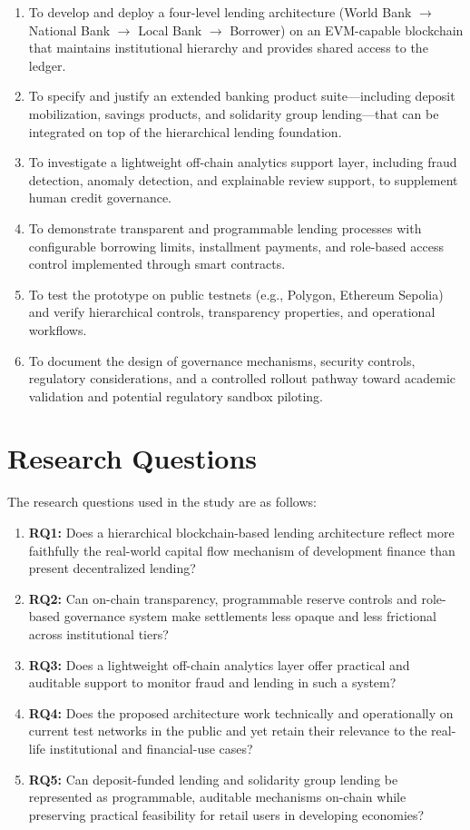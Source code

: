 \documentclass[12pt,a4paper]{report}
\begin{document}
\begin{enumerate}[noitemsep]
\item To develop and deploy a four-level lending architecture (World Bank $\to$ National Bank $\to$ Local Bank $\to$ Borrower) on an EVM-capable blockchain that maintains institutional hierarchy and provides shared access to the ledger.
\item To specify and justify an extended banking product suite---including deposit mobilization, savings products, and solidarity group lending---that can be integrated on top of the hierarchical lending foundation.
\item To investigate a lightweight off-chain analytics support layer, including fraud detection, anomaly detection, and explainable review support, to supplement human credit governance.
\item To demonstrate transparent and programmable lending processes with configurable borrowing limits, installment payments, and role-based access control implemented through smart contracts.
\item To test the prototype on public testnets (e.g., Polygon, Ethereum Sepolia) and verify hierarchical controls, transparency properties, and operational workflows.
\item To document the design of governance mechanisms, security controls, regulatory considerations, and a controlled rollout pathway toward academic validation and potential regulatory sandbox piloting.
\end{enumerate}

\section{Research Questions}

The research questions used in the study are as follows:

\begin{enumerate}[noitemsep]
\item \textbf{RQ1:} Does a hierarchical blockchain-based lending architecture reflect more faithfully the real-world capital flow mechanism of development finance than present decentralized lending?
\item \textbf{RQ2:} Can on-chain transparency, programmable reserve controls and role-based governance system make settlements less opaque and less frictional across institutional tiers?
\item \textbf{RQ3:} Does a lightweight off-chain analytics layer offer practical and auditable support to monitor fraud and lending in such a system?
\item \textbf{RQ4:} Does the proposed architecture work technically and operationally on current test networks in the public and yet retain their relevance to the real-life institutional and financial-use cases?
\item \textbf{RQ5:} Can deposit-funded lending and solidarity group lending be represented as programmable, auditable mechanisms on-chain while preserving practical feasibility for retail users in developing economies?
\end{enumerate}
\end{document}
